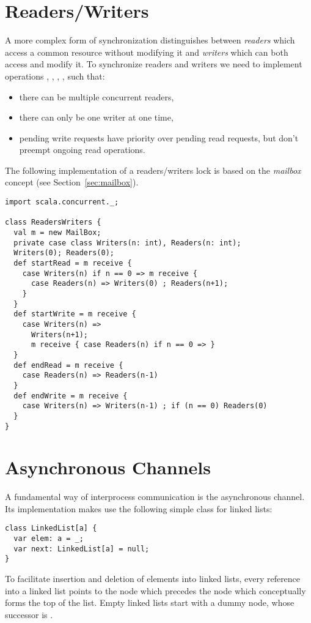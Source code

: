 {\section{Readers/Writers}

A more complex form of synchronization distinguishes between {\em
readers} which access a common resource without modifying it and {\em
writers} which can both access and modify it. To synchronize readers
and writers we need to implement operations , ,
, , such that:
\begin{itemize}
\item there can be multiple concurrent readers,
\item there can only be one writer at one time,
\item pending write requests have priority over pending read requests,
but don't preempt ongoing read operations.
\end{itemize}
The following implementation of a readers/writers lock is based on the
{\em mailbox} concept (see Section~\ref{sec:mailbox}).

\begin{lstlisting}
import scala.concurrent._;

class ReadersWriters {
  val m = new MailBox;
  private case class Writers(n: int), Readers(n: int);
  Writers(0); Readers(0);
  def startRead = m receive {
    case Writers(n) if n == 0 => m receive {
      case Readers(n) => Writers(0) ; Readers(n+1);
    }
  }
  def startWrite = m receive {
    case Writers(n) =>
      Writers(n+1);
      m receive { case Readers(n) if n == 0 => }
  }
  def endRead = m receive {
    case Readers(n) => Readers(n-1)
  }
  def endWrite = m receive {
    case Writers(n) => Writers(n-1) ; if (n == 0) Readers(0)
  }
}
\end{lstlisting}

\section{Asynchronous Channels}

A fundamental way of interprocess communication is the asynchronous
channel. Its implementation makes use the following simple class for linked
lists:
\begin{lstlisting}
class LinkedList[a] {
  var elem: a = _;
  var next: LinkedList[a] = null;
}
\end{lstlisting}
To facilitate insertion and deletion of elements into linked lists,
every reference into a linked list points to the node which precedes
the node which conceptually forms the top of the list.
Empty linked lists start with a dummy node, whose successor is .

}
